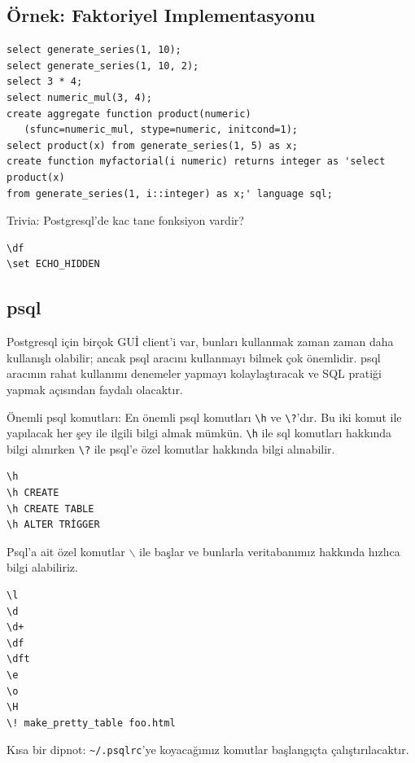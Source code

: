 \documentclass[11pt]{article}
\begin{document}
\subsection{Örnek: Faktoriyel Implementasyonu}
\label{sec-2-2}
\begin{verbatim}
select generate_series(1, 10);
select generate_series(1, 10, 2);
select 3 * 4;
select numeric_mul(3, 4);
create aggregate function product(numeric)
   (sfunc=numeric_mul, stype=numeric, initcond=1);
select product(x) from generate_series(1, 5) as x;
create function myfactorial(i numeric) returns integer as 'select product(x)
from generate_series(1, i::integer) as x;' language sql;
\end{verbatim}

Trivia: Postgresql'de kac tane fonksiyon vardir?

\begin{verbatim}
\df
\set ECHO_HIDDEN
\end{verbatim}

\subsection{psql}
\label{sec-2-3}

Postgresql için birçok GUİ client'i var, bunları kullanmak zaman zaman daha
kullanışlı olabilir; ancak psql aracını kullanmayı bilmek çok önemlidir. psql
aracının rahat kullanımı denemeler yapmayı kolaylaştıracak ve SQL pratiği yapmak
açısından faydalı olacaktır.

Önemli psql komutları: En önemli psql komutları \texttt{\textbackslash{}h} ve \texttt{\textbackslash{}?}'dır. Bu iki komut ile
yapılacak her şey ile ilgili bilgi almak mümkün. \texttt{\textbackslash{}h} ile sql komutları hakkında
bilgi alınırken \texttt{\textbackslash{}?} ile psql'e özel komutlar hakkında bilgi alınabilir.


\begin{verbatim}
\h
\h CREATE
\h CREATE TABLE
\h ALTER TRİGGER
\end{verbatim}

Psql'a ait özel komutlar $\backslash$ ile başlar ve bunlarla veritabanımız hakkında hızlıca
bilgi alabiliriz.

\begin{verbatim}
\l
\d
\d+
\df
\dft
\e
\o
\H
\! make_pretty_table foo.html
\end{verbatim}


Kısa bir dipnot: \texttt{\textasciitilde{}/.psqlrc}'ye koyacağımız komutlar başlangıçta
çalıştırılacaktır.
\end{document}
